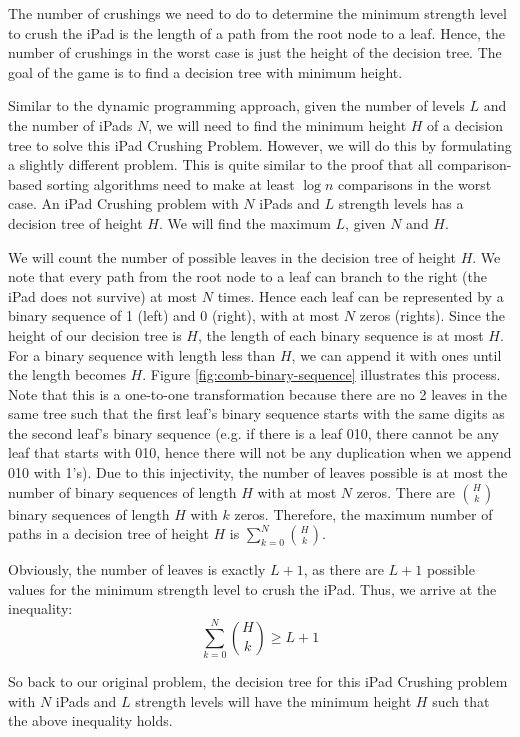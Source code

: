 \documentclass[12pt,a4paper,oneside]{report}
\begin{document}
The number of crushings we need to do to determine the minimum strength level to crush the iPad is the length of a path from the root node to a leaf. Hence, the number of crushings in the worst case is just the height of the decision tree. The goal of the game is to find a decision tree with minimum height.

Similar to the dynamic programming approach, given the number of levels $L$ and the number of iPads $N$, we will need to find the minimum height $H$ of a decision tree to solve this iPad Crushing Problem. However, we will do this by formulating a slightly different problem. This is quite similar to the proof that all comparison-based sorting algorithms need to make at least $\log n$ comparisons in the worst case. An iPad Crushing problem with $N$ iPads and $L$ strength levels has a decision tree of height $H$. We will find the maximum $L$, given $N$ and $H$.

We will count the number of possible leaves in the decision tree of height $H$. We note that every path from the root node to a leaf can branch to the right (the iPad does not survive) at most $N$ times. Hence each leaf can be represented by a binary sequence of 1 (left) and 0 (right), with at most $N$ zeros (rights). Since the height of our decision tree is $H$, the length of each binary sequence is at most $H$. For a binary sequence with length less than $H$, we can append it with ones until the length becomes $H$. Figure \ref{fig:comb-binary-sequence} illustrates this process. Note that this is a one-to-one transformation because there are no 2 leaves in the same tree such that the first leaf's binary sequence starts with the same digits as the second leaf's binary sequence (e.g. if there is a leaf 010, there cannot be any leaf that starts with 010, hence there will not be any duplication when we append 010 with 1's). Due to this injectivity, the number of leaves possible is at most the number of binary sequences of length $H$ with at most $N$ zeros. There are ${H \choose k}$ binary sequences of length $H$ with $k$ zeros. Therefore, the maximum number of paths in a decision tree of height $H$ is $\sum_{k=0}^{N} {H \choose k}$.

Obviously, the number of  leaves is exactly $L+1$, as there are $L+1$ possible values for the minimum strength level to crush the iPad. Thus, we arrive at the inequality: \[\sum_{k=0}^{N} {H \choose k} \geq L+1\]

So back to our original problem, the decision tree for this iPad Crushing problem with $N$ iPads and $L$ strength levels will have the minimum height $H$ such that the above inequality holds.
\end{document}
